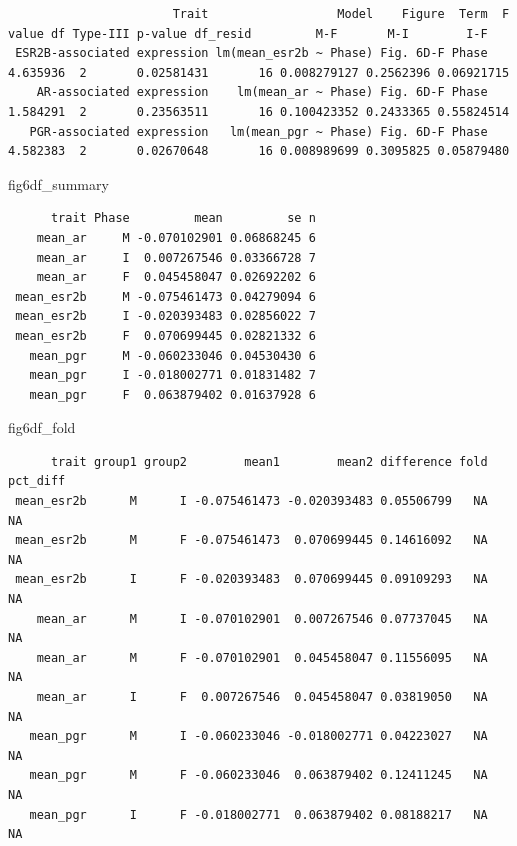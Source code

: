 \documentclass[
  landscape]{article}
\newenvironment{Shaded}{\begin{snugshade}}{\end{snugshade}}
\newcommand{\NormalTok}[1]{#1}
\begin{document}
\begin{verbatim}
                       Trait                  Model    Figure  Term  F value df Type-III p-value df_resid         M-F       M-I        I-F
 ESR2B-associated expression lm(mean_esr2b ~ Phase) Fig. 6D-F Phase 4.635936  2       0.02581431       16 0.008279127 0.2562396 0.06921715
    AR-associated expression    lm(mean_ar ~ Phase) Fig. 6D-F Phase 1.584291  2       0.23563511       16 0.100423352 0.2433365 0.55824514
   PGR-associated expression   lm(mean_pgr ~ Phase) Fig. 6D-F Phase 4.582383  2       0.02670648       16 0.008989699 0.3095825 0.05879480
\end{verbatim}

\begin{Shaded}
\begin{Highlighting}[]
\NormalTok{fig6df\_summary}
\end{Highlighting}
\end{Shaded}

\begin{verbatim}
      trait Phase         mean         se n
    mean_ar     M -0.070102901 0.06868245 6
    mean_ar     I  0.007267546 0.03366728 7
    mean_ar     F  0.045458047 0.02692202 6
 mean_esr2b     M -0.075461473 0.04279094 6
 mean_esr2b     I -0.020393483 0.02856022 7
 mean_esr2b     F  0.070699445 0.02821332 6
   mean_pgr     M -0.060233046 0.04530430 6
   mean_pgr     I -0.018002771 0.01831482 7
   mean_pgr     F  0.063879402 0.01637928 6
\end{verbatim}

\begin{Shaded}
\begin{Highlighting}[]
\NormalTok{fig6df\_fold}
\end{Highlighting}
\end{Shaded}

\begin{verbatim}
      trait group1 group2        mean1        mean2 difference fold pct_diff
 mean_esr2b      M      I -0.075461473 -0.020393483 0.05506799   NA       NA
 mean_esr2b      M      F -0.075461473  0.070699445 0.14616092   NA       NA
 mean_esr2b      I      F -0.020393483  0.070699445 0.09109293   NA       NA
    mean_ar      M      I -0.070102901  0.007267546 0.07737045   NA       NA
    mean_ar      M      F -0.070102901  0.045458047 0.11556095   NA       NA
    mean_ar      I      F  0.007267546  0.045458047 0.03819050   NA       NA
   mean_pgr      M      I -0.060233046 -0.018002771 0.04223027   NA       NA
   mean_pgr      M      F -0.060233046  0.063879402 0.12411245   NA       NA
   mean_pgr      I      F -0.018002771  0.063879402 0.08188217   NA       NA
\end{verbatim}
\end{document}
